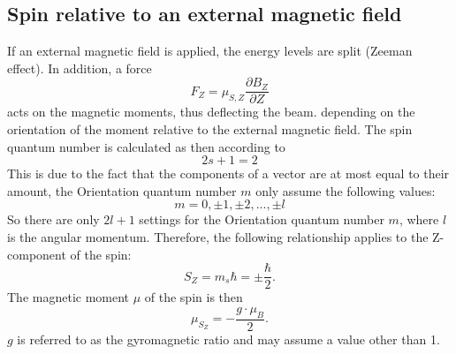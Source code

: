 \subsection{Spin relative to an external magnetic field}
If an external magnetic field is applied, the energy levels are split (Zeeman effect).
In addition, a force
\begin{equation}
  F_Z=\mu_{S,Z}\frac{\partial B_Z}{\partial Z}
\end{equation}
acts on the magnetic moments, thus deflecting the beam.
depending on the orientation of the moment relative
to the external magnetic field. The spin quantum number is calculated as
then according to
\begin{equation}
  2s+1=2
\end{equation}
This is due to the fact that the components of a vector are at most equal to their
amount, the Orientation quantum number $m$ only assume the following values:
\begin{equation}
  m=0,\pm1,\pm2,...,\pm l
\end{equation}
So there are only $2l+1$ settings for the Orientation quantum number $m$, where $l$ is the angular momentum.
Therefore, the following relationship applies to the Z-component of the spin:
\begin{equation}
  S_Z=m_s\hbar=\pm\frac{\hbar}{2}.
\end{equation}
The magnetic moment $\mu$ of the spin is then
\begin{equation}
  \mu_{S_Z}=-\frac{g\cdot\mu_B}{2}.
\end{equation}
$g$ is referred to as the gyromagnetic ratio and may assume a value other than 1.
